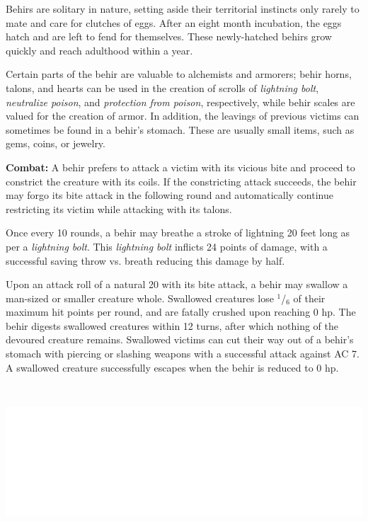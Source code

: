 \begin{multicols}{2}
Behirs are solitary in nature, setting aside their territorial instincts only rarely to mate and care for clutches of eggs. After an eight month incubation, the eggs hatch and are left to fend for themselves. These newly-hatched behirs grow quickly and reach adulthood within a year.

Certain parts of the behir are valuable to alchemists and armorers; behir horns, talons, and hearts can be used in the creation of scrolls of \textit{lightning bolt}, \textit{neutralize poison}, and \textit{protection from poison}, respectively, while behir scales are valued for the creation of armor. In addition, the leavings of previous victims can sometimes be found in a behir's stomach. These are usually small items, such as gems, coins, or jewelry.

\textbf{Combat:} A behir prefers to attack a victim with its vicious bite and proceed to constrict the creature with its coils. If the constricting attack succeeds, the behir may forgo its bite attack in the following round and automatically continue restricting its victim while attacking with its talons.

Once every 10 rounds, a behir may breathe a stroke of lightning 20 feet long as per a \textit{lightning bolt}. This \textit{lightning bolt} inflicts 24 points of damage, with a successful saving throw vs. breath reducing this damage by half.

Upon an attack roll of a natural 20 with its bite attack, a behir may swallow a man-sized or smaller creature whole. Swallowed creatures lose $^1$/$_6$ of their maximum hit points per round, and are fatally crushed upon reaching 0 hp. The behir digests swallowed creatures within 12 turns, after which nothing of the devoured creature remains. Swallowed victims can cut their way out of a behir's stomach with piercing or slashing weapons with a successful attack against AC 7. A swallowed creature successfully escapes when the behir is reduced to 0 hp.

\noindent\includegraphics[width=\columnwidth, height=2.25in]{testblock.pdf} 


\end{multicols}
